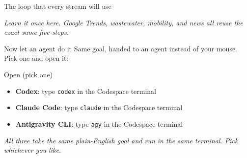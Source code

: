 \documentclass[aspectratio=169,11pt]{beamer}
\begin{document}
\begin{frame}{The loop that every stream will use}
  \begin{center}
  \end{center}
  \vspace{0.5em}
  \begin{center}
    \itshape Learn it once here. Google Trends, wastewater, mobility, and news all reuse
    the exact same five steps.
  \end{center}
\end{frame}

\begin{frame}{Now let an agent do it}
  Same goal, handed to an agent instead of your mouse. Pick one and open it:
  \begin{exampleblock}{Open (pick one)}
    \begin{itemize}
      \item \textbf{Codex}: type \texttt{codex} in the Codespace terminal
      \item \textbf{Claude Code}: type \texttt{claude} in the Codespace terminal
      \item \textbf{Antigravity CLI}: type \texttt{agy} in the Codespace terminal
    \end{itemize}
  \end{exampleblock}
  \begin{center}
    \itshape All three take the same plain-English goal and run in the same terminal.
    Pick whichever you like.
  \end{center}
\end{frame}
\end{document}
